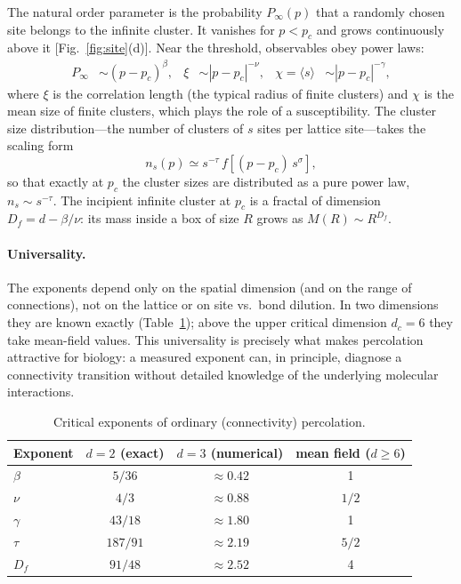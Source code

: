 \documentclass[11pt]{article}
\begin{document}
The natural order parameter is the probability $P_\infty(p)$ that a randomly chosen site belongs to the infinite cluster. It vanishes for $p<p_c$ and grows continuously above it [Fig.~\ref{fig:site}(d)]. Near the threshold, observables obey power laws:
\begin{align}
P_\infty &\sim (p-p_c)^{\beta}, & \xi &\sim |p-p_c|^{-\nu}, & \chi=\langle s\rangle &\sim |p-p_c|^{-\gamma},
\end{align}
where $\xi$ is the correlation length (the typical radius of finite clusters) and $\chi$ is the mean size of finite clusters, which plays the role of a susceptibility. The cluster size distribution---the number of clusters of $s$ sites per lattice site---takes the scaling form
\begin{equation}
n_s(p)\simeq s^{-\tau}\, f\!\left[(p-p_c)\,s^{\sigma}\right],
\label{eq:ns}
\end{equation}
so that exactly at $p_c$ the cluster sizes are distributed as a pure power law, $n_s\sim s^{-\tau}$. The incipient infinite cluster at $p_c$ is a fractal of dimension $D_f=d-\beta/\nu$: its mass inside a box of size $R$ grows as $M(R)\sim R^{D_f}$.

\paragraph{Universality.} The exponents depend only on the spatial dimension (and on the range of connections), not on the lattice or on site vs.\ bond dilution. In two dimensions they are known exactly (Table~\ref{tab:exp}); above the upper critical dimension $d_c=6$ they take mean-field values. This universality is precisely what makes percolation attractive for biology: a measured exponent can, in principle, diagnose a connectivity transition without detailed knowledge of the underlying molecular interactions.

\begin{table}[h]
\centering
\caption{Critical exponents of ordinary (connectivity) percolation.}
\label{tab:exp}
\begin{tabular}{lccc}
\toprule
Exponent & $d=2$ (exact) & $d=3$ (numerical) & mean field ($d\ge6$)\\
\midrule
$\beta$ & $5/36$ & $\approx0.42$ & 1\\
$\nu$ & $4/3$ & $\approx0.88$ & $1/2$\\
$\gamma$ & $43/18$ & $\approx1.80$ & 1\\
$\tau$ & $187/91$ & $\approx2.19$ & $5/2$\\
$D_f$ & $91/48$ & $\approx2.52$ & 4\\
\bottomrule
\end{tabular}
\end{table}
\end{document}
